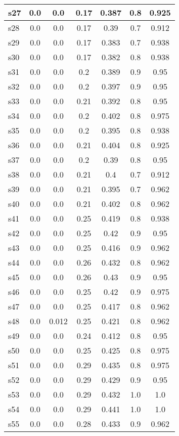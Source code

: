 \documentclass{article}
\begin{document}
\begin{tabular}{|l|c|c|c|c|c|c|}
\hline
s27 &0.0 & 0.0 & 0.17 & 0.387 & 0.8 & 0.925\\
\hline
s28 &0.0 & 0.0 & 0.17 & 0.39 & 0.7 & 0.912\\
\hline
s29 &0.0 & 0.0 & 0.17 & 0.383 & 0.7 & 0.938\\
\hline
s30 &0.0 & 0.0 & 0.17 & 0.382 & 0.8 & 0.938\\
\hline
s31 &0.0 & 0.0 & 0.2 & 0.389 & 0.9 & 0.95\\
\hline
s32 &0.0 & 0.0 & 0.2 & 0.397 & 0.9 & 0.95\\
\hline
s33 &0.0 & 0.0 & 0.21 & 0.392 & 0.8 & 0.95\\
\hline
s34 &0.0 & 0.0 & 0.2 & 0.402 & 0.8 & 0.975\\
\hline
s35 &0.0 & 0.0 & 0.2 & 0.395 & 0.8 & 0.938\\
\hline
s36 &0.0 & 0.0 & 0.21 & 0.404 & 0.8 & 0.925\\
\hline
s37 &0.0 & 0.0 & 0.2 & 0.39 & 0.8 & 0.95\\
\hline
s38 &0.0 & 0.0 & 0.21 & 0.4 & 0.7 & 0.912\\
\hline
s39 &0.0 & 0.0 & 0.21 & 0.395 & 0.7 & 0.962\\
\hline
s40 &0.0 & 0.0 & 0.21 & 0.402 & 0.8 & 0.962\\
\hline
s41 &0.0 & 0.0 & 0.25 & 0.419 & 0.8 & 0.938\\
\hline
s42 &0.0 & 0.0 & 0.25 & 0.42 & 0.9 & 0.95\\
\hline
s43 &0.0 & 0.0 & 0.25 & 0.416 & 0.9 & 0.962\\
\hline
s44 &0.0 & 0.0 & 0.26 & 0.432 & 0.8 & 0.962\\
\hline
s45 &0.0 & 0.0 & 0.26 & 0.43 & 0.9 & 0.95\\
\hline
s46 &0.0 & 0.0 & 0.25 & 0.42 & 0.9 & 0.975\\
\hline
s47 &0.0 & 0.0 & 0.25 & 0.417 & 0.8 & 0.962\\
\hline
s48 &0.0 & 0.012 & 0.25 & 0.421 & 0.8 & 0.962\\
\hline
s49 &0.0 & 0.0 & 0.24 & 0.412 & 0.8 & 0.95\\
\hline
s50 &0.0 & 0.0 & 0.25 & 0.425 & 0.8 & 0.975\\
\hline
s51 &0.0 & 0.0 & 0.29 & 0.435 & 0.8 & 0.975\\
\hline
s52 &0.0 & 0.0 & 0.29 & 0.429 & 0.9 & 0.95\\
\hline
s53 &0.0 & 0.0 & 0.29 & 0.432 & 1.0 & 1.0\\
\hline
s54 &0.0 & 0.0 & 0.29 & 0.441 & 1.0 & 1.0\\
\hline
s55 &0.0 & 0.0 & 0.28 & 0.433 & 0.9 & 0.962\\

\end{tabular}
\end{document}
